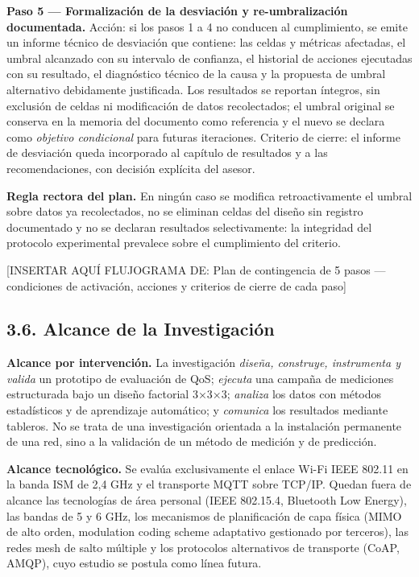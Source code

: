 \documentclass[
  12pt,
]{article}
\begin{document}
\textbf{Paso 5 — Formalización de la desviación y re-umbralización
documentada.} Acción: si los pasos 1 a 4 no conducen al cumplimiento, se
emite un informe técnico de desviación que contiene: las celdas y
métricas afectadas, el umbral alcanzado con su intervalo de confianza,
el historial de acciones ejecutadas con su resultado, el diagnóstico
técnico de la causa y la propuesta de umbral alternativo debidamente
justificada. Los resultados se reportan íntegros, sin exclusión de
celdas ni modificación de datos recolectados; el umbral original se
conserva en la memoria del documento como referencia y el nuevo se
declara como \emph{objetivo condicional} para futuras iteraciones.
Criterio de cierre: el informe de desviación queda incorporado al
capítulo de resultados y a las recomendaciones, con decisión explícita
del asesor.

\textbf{Regla rectora del plan.} En ningún caso se modifica
retroactivamente el umbral sobre datos ya recolectados, no se eliminan
celdas del diseño sin registro documentado y no se declaran resultados
selectivamente: la integridad del protocolo experimental prevalece sobre
el cumplimiento del criterio.

{[}INSERTAR AQUÍ FLUJOGRAMA DE: Plan de contingencia de 5 pasos —
condiciones de activación, acciones y criterios de cierre de cada
paso{]}

\subsection{3.6. Alcance de la
Investigación}\label{alcance-de-la-investigaciuxf3n}

\textbf{Alcance por intervención.} La investigación \emph{diseña,
construye, instrumenta y valida} un prototipo de evaluación de QoS;
\emph{ejecuta} una campaña de mediciones estructurada bajo un diseño
factorial 3×3×3; \emph{analiza} los datos con métodos estadísticos y de
aprendizaje automático; y \emph{comunica} los resultados mediante
tableros. No se trata de una investigación orientada a la instalación
permanente de una red, sino a la validación de un método de medición y
de predicción.

\textbf{Alcance tecnológico.} Se evalúa exclusivamente el enlace Wi-Fi
IEEE 802.11 en la banda ISM de 2,4 GHz y el transporte MQTT sobre
TCP/IP. Quedan fuera de alcance las tecnologías de área personal (IEEE
802.15.4, Bluetooth Low Energy), las bandas de 5 y 6 GHz, los mecanismos
de planificación de capa física (MIMO de alto orden, modulation coding
scheme adaptativo gestionado por terceros), las redes mesh de salto
múltiple y los protocolos alternativos de transporte (CoAP, AMQP), cuyo
estudio se postula como línea futura.
\end{document}
